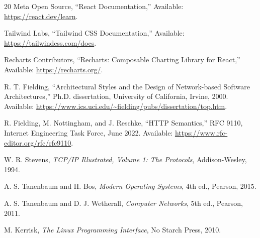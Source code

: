 \documentclass[conference]{IEEEtran}
\begin{document}
\begin{thebibliography}{20}
Meta Open Source,
``React Documentation,''
Available: \url{https://react.dev/learn}.

Tailwind Labs,
``Tailwind CSS Documentation,''
Available: \url{https://tailwindcss.com/docs}.

Recharts Contributors,
``Recharts: Composable Charting Library for React,''
Available: \url{https://recharts.org/}.

R. T. Fielding,
``Architectural Styles and the Design of Network-based
Software Architectures,''
Ph.D. dissertation, University of California,
Irvine, 2000.
Available: \url{https://www.ics.uci.edu/~fielding/pubs/dissertation/top.htm}.

R. Fielding, M. Nottingham, and J. Reschke,
``HTTP Semantics,''
RFC 9110, Internet Engineering Task Force,
June 2022.
Available: \url{https://www.rfc-editor.org/rfc/rfc9110}.

W. R. Stevens,
\emph{TCP/IP Illustrated, Volume 1: The Protocols},
Addison-Wesley, 1994.

A. S. Tanenbaum and H. Bos,
\emph{Modern Operating Systems},
4th ed., Pearson, 2015.

A. S. Tanenbaum and D. J. Wetherall,
\emph{Computer Networks},
5th ed., Pearson, 2011.

M. Kerrisk,
\emph{The Linux Programming Interface},
No Starch Press, 2010.

\end{thebibliography}
\end{document}
